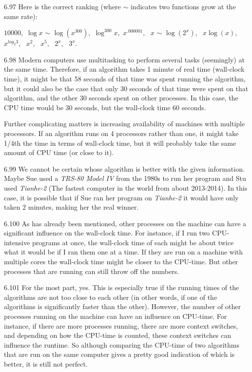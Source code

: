 \begin{Answer}{6.97}
Here is the correct ranking (where $\sim$ indicates two functions grow at the same rate):

\noindent
$10000$,\,
$\log x$ $\sim$ $\log (x^{300})$,\,
$\log^{300} x$,\,
$x^{.000001}$, \,
$x$ $\sim$ $\log(2^x)$,  \,
$x \log(x)$,  \,
$x^{log_2 3}$, \,
$x^2$, \,
$x^{5}$, \,
$2^x$,  \,
$3^x$.
\end{Answer}
\begin{Answer}{6.98}
Modern computers use multitasking to perform several tasks (seemingly) at the same time.
Therefore, if an algorithm takes 1 minute of real time (wall-clock time), it might be that
58 seconds of that time was spent running the algorithm, but it could also be the case that
only 30 seconds of that time were spent on that algorithm, and the other 30 seconds spent
on other processes.  In this case, the CPU time would be 30 seconds, but the wall-clock time
60 seconds.

Further complicating matters is increasing availability of machines
with multiple processors.  If an algorithm runs on 4 processors rather than one, it
might take 1/4th the time in terms of wall-clock time, but it will probably take the
same amount of CPU time (or close to it).
\end{Answer}
\begin{Answer}{6.99}
We cannot be certain whose algorithm is better with the given information.
Maybe Sue used a {\em TRS-80 Model IV} from the 1980s to run her program and Stu used
{\em Tianhe-2} (The fastest computer in the world from about 2013-2014).
In this case, it is possible that if Sue ran her program on {\em Tianhe-2}
it would have only taken 2 minutes, making her the real winner.
\end{Answer}
\begin{Answer}{6.100}
As has already been mentioned, other processes on the machine can have a significant influence
on the wall-clock time.  For instance, if I run two CPU-intensive programs at once, the wall-clock time of each might be about twice what it would be if I ran them one at a time.
If they are run on a machine with multiple cores
the wall-clock time might be closer to the CPU-time.  But other processes that are
running can still throw off the numbers.
\end{Answer}
\begin{Answer}{6.101}
For the most part, yes.  This is especially true if the running times of the algorithms
are not too close to each other (in other words, if one of the algorithms is significantly
faster than the other).
However, the number of other processes running on the machine
can have an influence on CPU-time.  For instance, if there are more processes running,
there are more context switches, and depending on how the CPU-time is counted, these context
switches can influence the runtime.  So although comparing the CPU-time of two algorithms
that are run on the same computer gives a pretty good indication of which is better, it
is still not perfect.
\end{Answer}
